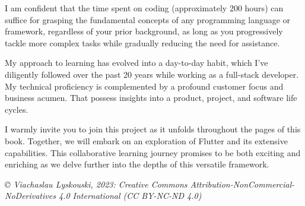 \vspace{3mm}

\noindent I am confident that the time spent on coding (approximately 200 hours) can suffice for grasping the 
fundamental concepts of any programming language or framework, regardless of your prior background, as long as you 
progressively tackle more complex tasks while gradually reducing the need for assistance.

\vspace{3mm}

\noindent My approach to learning has evolved into a day-to-day habit, which I've diligently followed over the past 
20 years while working as a full-stack developer. My technical proficiency is complemented by a profound customer 
focus and business acumen. That possess insights into a product, project, and software life cycles.

\vspace{3mm}

\noindent I warmly invite you to join this project as it unfolds throughout the pages of this book. Together, we will 
embark on an exploration of Flutter and its extensive capabilities. This collaborative learning journey promises to 
be both exciting and enriching as we delve further into the depths of this versatile framework.


\vspace{1cm}


\noindent \emph{\small © Viachaslau Lyskouski, 2023: Creative Commons Attribution-NonCommercial-NoDerivatives 4.0 
International (CC BY-NC-ND 4.0)}
            

\newpage
\thispagestyle{empty}
~